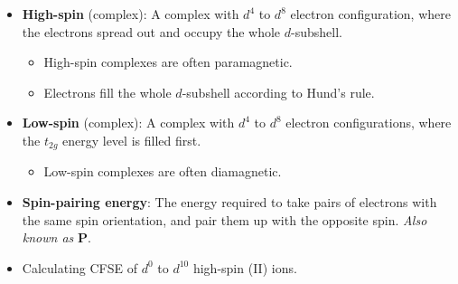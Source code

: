 \documentclass[../notes.tex]{subfiles}
\begin{document}
\begin{itemize}
\begin{itemize}
    \end{itemize}
    \item \textbf{High-spin} (complex): A complex with $d^4$ to $d^8$ electron configuration, where the electrons spread out and occupy the whole $d$-subshell.
    \begin{itemize}
        \item High-spin complexes are often paramagnetic.
        \item Electrons fill the whole $d$-subshell according to Hund's rule.
    \end{itemize}
    \item \textbf{Low-spin} (complex): A complex with $d^4$ to $d^8$ electron configurations, where the $t_{2g}$ energy level is filled first.
    \begin{itemize}
        \item Low-spin complexes are often diamagnetic.
    \end{itemize}
    \item \textbf{Spin-pairing energy}: The energy required to take pairs of electrons with the same spin orientation, and pair them up with the opposite spin. \emph{Also known as} $\bm{P}$.
    \item Calculating CFSE of $d^0$ to $d^{10}$ high-spin  (II) ions.
    \begin{figure}[H]
        \centering
\end{figure}
\end{itemize}
\end{document}

